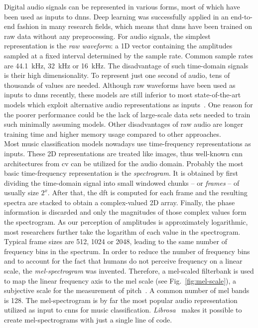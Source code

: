 Digital audio signals can be represented in various forms, most of which have been used as inputs to \glspl{dnn}. Deep learning was successfully applied in an end-to-end fashion in many research fields, which means that \glspl{dnn} have been trained on raw data without any preprocessing. For audio signals, the simplest representation is the \textit{raw waveform}: a 1D vector containing the amplitudes sampled at a fixed interval determined by the sample rate. Common sample rates are \SI{44.1}{\kilo\hertz}, \SI{32}{\kilo\hertz} or \SI{16}{\kilo\hertz}. The disadvantage of such time-domain signals is their high dimensionality. To represent just one second of audio, tens of thousands of values are needed. Although raw waveforms have been used as inputs to \glspl{dnn} recently, these models are still inferior to most state-of-the-art models which exploit alternative audio representations as inputs~\cite{won2020evaluation}. One reason for the poorer performance could be the lack of large-scale data sets needed to train such minimally assuming models. Other disadvantages of raw audio are longer training time and higher memory usage compared to other approaches.\\

Most music classification models nowadays use time-frequency representations as inputs. These 2D representations are treated like images, thus well-known \gls{cnn} architectures from \gls{cv} can be utilized for the audio domain. Probably the most basic time-frequency representation is the \textit{spectrogram}. It is obtained by first dividing the time-domain signal into small windowed chunks -- or \textit{frames} -- of usually size $2^{x}$. After that, the \gls{dft} is computed for each frame and the resulting spectra are stacked to obtain a complex-valued 2D array. Finally, the phase information is discarded and only the magnitudes of those complex values form the spectrogram. As our perception of amplitudes is approximately logarithmic, most researchers further take the logarithm of each value in the spectrogram. Typical frame sizes are 512, 1024 or 2048, leading to the same number of frequency bins in the spectrum. In order to reduce the number of frequency bins and to account for the fact that humans do not perceive frequency on a linear scale, the \textit{mel-spectrogram} was invented. Therefore, a mel-scaled filterbank is used to map the linear frequency axis to the mel scale (see Fig.~\ref{fig:mel-scale}), a subjective scale for the measurement of pitch~\cite{stevens1937melscale}. A common number of mel bands is 128. The mel-spectrogram is by far the most popular audio representation utilized as input to \glspl{cnn} for music classification. \textit{Librosa}~\cite{mcfee2015librosa} makes it possible to create mel-spectrograms with just a single line of code.\\


